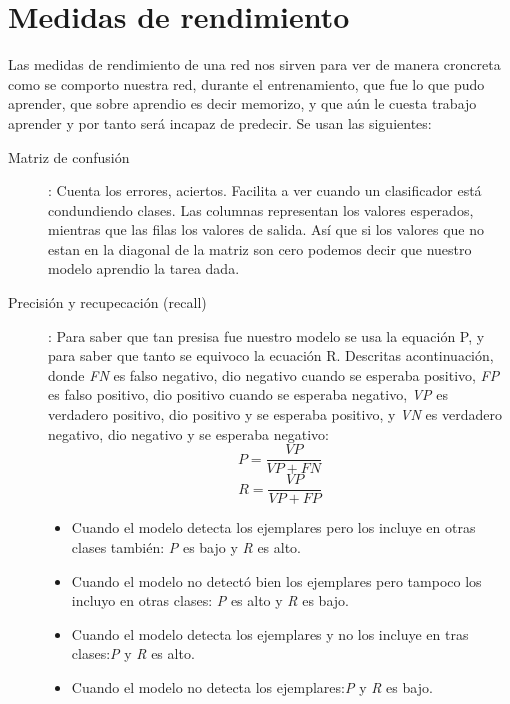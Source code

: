 \section{Medidas de rendimiento}

Las medidas de rendimiento de una red nos sirven para ver de manera croncreta como se comporto nuestra red, durante el entrenamiento, que fue lo que pudo aprender, que sobre aprendio es decir memorizo, y que aún le cuesta trabajo aprender y por tanto será incapaz de predecir. Se usan las siguientes:

\begin{description}
 \item [Matriz de confusión]: Cuenta los errores, aciertos. Facilita a ver cuando un clasificador está condundiendo clases. Las columnas representan los valores esperados, mientras que las filas los valores de salida. Así que si los valores que no estan en la diagonal de la matriz son cero podemos decir que nuestro modelo aprendio la tarea dada.
 \item [Precisión y recupecación (recall)]: Para saber que tan presisa fue nuestro modelo se usa la equación P, y para saber que tanto se equivoco la ecuación R. Descritas acontinuación, donde \emph{FN} es falso negativo, dio negativo cuando se esperaba positivo, \emph{FP} es falso positivo, dio positivo cuando se esperaba negativo, \emph{VP} es verdadero positivo, dio positivo y se esperaba positivo, y \emph{VN} es verdadero negativo, dio negativo y se esperaba negativo:
    \begin{equation}
        P = \dfrac{VP}{VP+FN} 
    \end{equation}
    \begin{equation}
        R = \dfrac{VP}{VP+FP} 
    \end{equation}
    
    \begin{itemize}
     \item Cuando el modelo detecta los ejemplares pero los incluye en otras clases también: \emph{P} es bajo y \emph{R} es alto. 
     \item Cuando el modelo no detectó bien los ejemplares pero tampoco los incluyo en otras clases: \emph{P} es alto y \emph{R} es bajo. 
     \item Cuando el modelo detecta los ejemplares y no los incluye en tras clases:\emph{P} y \emph{R} es alto. 
     \item Cuando el modelo no detecta los ejemplares:\emph{P} y \emph{R} es bajo. 
     \end{itemize}


\end{description}
